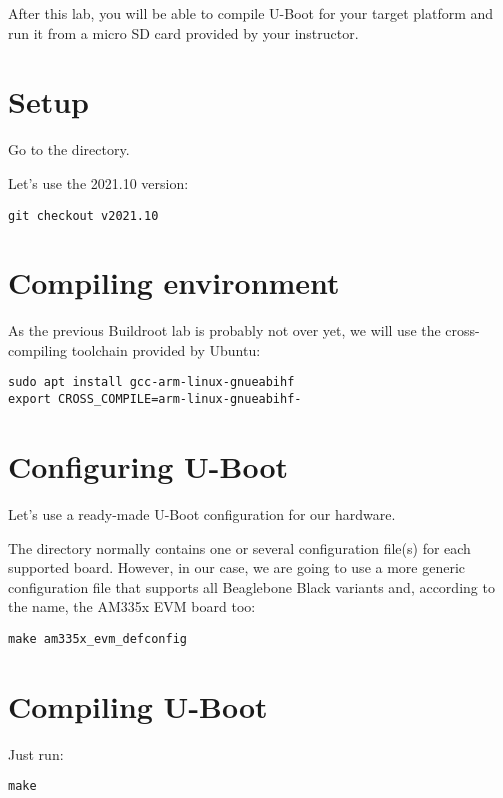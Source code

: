 
After this lab, you will be able to compile U-Boot for your target
platform and run it from a micro SD card provided by your instructor.

\section{Setup}

Go to the  directory.

Let's use the 2021.10 version:
\begin{verbatim}
git checkout v2021.10
\end{verbatim}

\section{Compiling environment}

As the previous Buildroot lab is probably not over yet, we will
use the cross-compiling toolchain provided by Ubuntu:

\begin{verbatim}
sudo apt install gcc-arm-linux-gnueabihf
export CROSS_COMPILE=arm-linux-gnueabihf-
\end{verbatim}

\section{Configuring U-Boot}

Let's use a ready-made U-Boot configuration for our hardware.

The  directory normally contains one or several
configuration file(s) for each supported board. However, in our case,
we are going to use a more generic configuration file that supports all
Beaglebone Black variants and, according to the name, the AM335x EVM board too:

\begin{verbatim}
make am335x_evm_defconfig
\end{verbatim}

\section{Compiling U-Boot}

Just run:
\begin{verbatim}
make
\end{verbatim}

